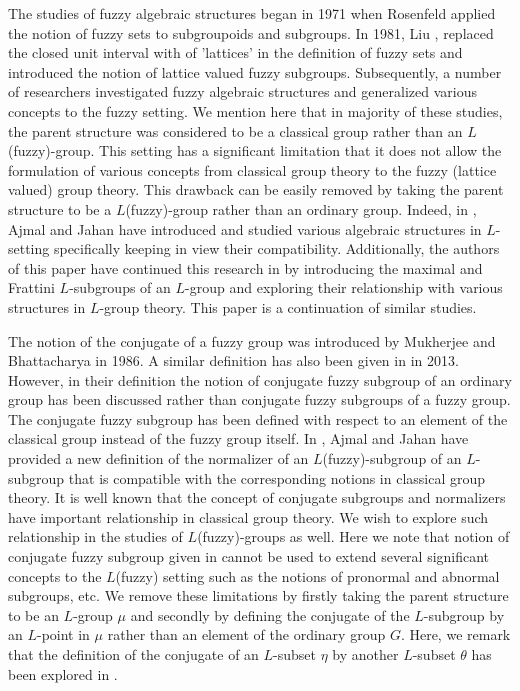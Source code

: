 \documentclass[10pt]{article}
\theoremstyle{plain}
\theoremstyle{definition}
\theoremstyle{remark}
\theoremstyle{case}
\begin{document}
\noindent The studies of fuzzy algebraic structures began in 1971 when Rosenfeld \cite{rosenfeld_fuzzy} applied the notion of fuzzy sets to subgroupoids and subgroups. In 1981, Liu \cite{liu_op}, replaced the closed unit interval with  of 'lattices' in the definition of fuzzy sets and introduced the notion of lattice valued fuzzy subgroups. Subsequently, a number of researchers investigated fuzzy algebraic structures and generalized various concepts to the fuzzy setting. We mention here that in majority of these studies, the parent structure was considered to be a classical group rather than an $L$(fuzzy)-group. This setting has a significant limitation that it does not allow  the formulation of various concepts from classical group theory to the fuzzy (lattice valued)  group theory. This drawback can be easily removed by taking the parent structure to be a $L$(fuzzy)-group rather than an ordinary group. Indeed, in \cite{ajmal_gen, ajmal_char, ajmal_nc, ajmal_nil, ajmal_nor, ajmal_sol}, Ajmal and Jahan have introduced and studied various algebraic structures in $L$-setting specifically keeping in view their compatibility. Additionally, the authors of this paper have continued this research in \cite{jahan_max, jahan_app} by introducing the maximal and Frattini $L$-subgroups of an $L$-group and exploring their relationship with various structures in $L$-group theory. This paper is a continuation of similar studies. 

The notion of the conjugate of a fuzzy group was introduced by Mukherjee and Bhattacharya \cite{mukherjee_some} in 1986. 
A similar definition has also been given in \cite{shukla_con} in 2013.  However, in their definition the notion of conjugate fuzzy subgroup of an ordinary group has been discussed rather than conjugate fuzzy subgroups of a fuzzy group. The conjugate fuzzy subgroup has been defined with respect to an element of the classical group instead of the fuzzy group itself. In \cite{ajmal_nil}, Ajmal and Jahan have provided a new definition of the normalizer of an $L$(fuzzy)-subgroup of an $L$-subgroup that is compatible with the corresponding notions in classical group theory. It is well known that the concept of conjugate subgroups and normalizers have important relationship in classical group theory. We wish to explore such relationship in the studies of $L$(fuzzy)-groups as well. Here we note that notion of conjugate fuzzy subgroup given in  \cite{mukherjee_some, shukla_con} cannot be used to extend several significant concepts to the $L$(fuzzy) setting such as the notions of pronormal and abnormal subgroups, etc. We remove these limitations by firstly taking the parent structure to be an $L$-group $\mu$ and secondly by defining the conjugate of the $L$-subgroup by an $L$-point in $\mu$ rather than an element of the ordinary group $G$. Here, we remark that the definition of the conjugate of an $L$-subset $\eta$ by another $L$-subset $\theta$ has been explored in \cite{jahan_nil}.
\end{document}
